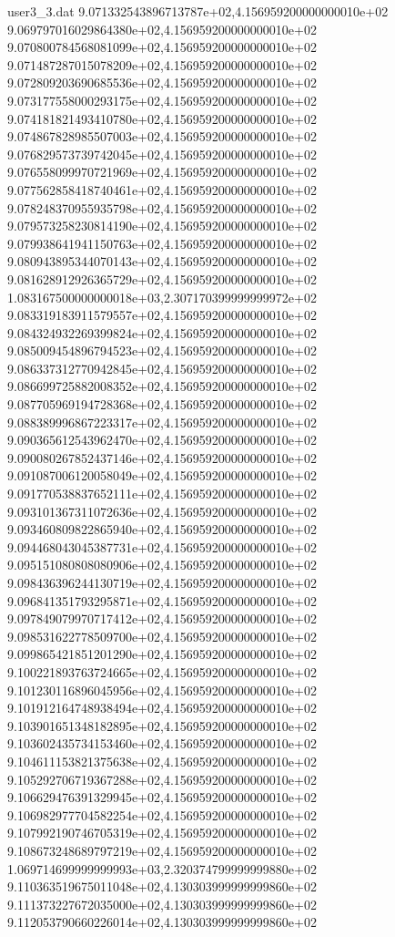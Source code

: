 \begin{filecontents}{user3_3.dat}
9.071332543896713787e+02,4.156959200000000010e+02
9.069797016029864380e+02,4.156959200000000010e+02
9.070800784568081099e+02,4.156959200000000010e+02
9.071487287015078209e+02,4.156959200000000010e+02
9.072809203690685536e+02,4.156959200000000010e+02
9.073177558000293175e+02,4.156959200000000010e+02
9.074181821493410780e+02,4.156959200000000010e+02
9.074867828985507003e+02,4.156959200000000010e+02
9.076829573739742045e+02,4.156959200000000010e+02
9.076558099970721969e+02,4.156959200000000010e+02
9.077562858418740461e+02,4.156959200000000010e+02
9.078248370955935798e+02,4.156959200000000010e+02
9.079573258230814190e+02,4.156959200000000010e+02
9.079938641941150763e+02,4.156959200000000010e+02
9.080943895344070143e+02,4.156959200000000010e+02
9.081628912926365729e+02,4.156959200000000010e+02
1.083167500000000018e+03,2.307170399999999972e+02
9.083319183911579557e+02,4.156959200000000010e+02
9.084324932269399824e+02,4.156959200000000010e+02
9.085009454896794523e+02,4.156959200000000010e+02
9.086337312770942845e+02,4.156959200000000010e+02
9.086699725882008352e+02,4.156959200000000010e+02
9.087705969194728368e+02,4.156959200000000010e+02
9.088389996867223317e+02,4.156959200000000010e+02
9.090365612543962470e+02,4.156959200000000010e+02
9.090080267852437146e+02,4.156959200000000010e+02
9.091087006120058049e+02,4.156959200000000010e+02
9.091770538837652111e+02,4.156959200000000010e+02
9.093101367311072636e+02,4.156959200000000010e+02
9.093460809822865940e+02,4.156959200000000010e+02
9.094468043045387731e+02,4.156959200000000010e+02
9.095151080808080906e+02,4.156959200000000010e+02
9.098436396244130719e+02,4.156959200000000010e+02
9.096841351793295871e+02,4.156959200000000010e+02
9.097849079970717412e+02,4.156959200000000010e+02
9.098531622778509700e+02,4.156959200000000010e+02
9.099865421851201290e+02,4.156959200000000010e+02
9.100221893763724665e+02,4.156959200000000010e+02
9.101230116896045956e+02,4.156959200000000010e+02
9.101912164748938494e+02,4.156959200000000010e+02
9.103901651348182895e+02,4.156959200000000010e+02
9.103602435734153460e+02,4.156959200000000010e+02
9.104611153821375638e+02,4.156959200000000010e+02
9.105292706719367288e+02,4.156959200000000010e+02
9.106629476391329945e+02,4.156959200000000010e+02
9.106982977704582254e+02,4.156959200000000010e+02
9.107992190746705319e+02,4.156959200000000010e+02
9.108673248689797219e+02,4.156959200000000010e+02
1.069714699999999993e+03,2.320374799999999880e+02
9.110363519675011048e+02,4.130303999999999860e+02
9.111373227672035000e+02,4.130303999999999860e+02
9.112053790660226014e+02,4.130303999999999860e+02

\end{filecontents}
